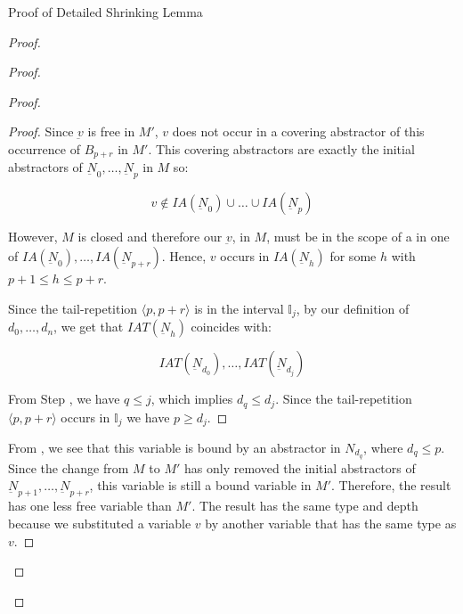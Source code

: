 \begin{frame}[allowframebreaks]{Proof of Detailed Shrinking Lemma}
\begin{proof}
\begin{proof}
\begin{proof}
\begin{proof}
Since $\underbar{v}$ is free in $M'$, $v$ does not occur in a covering abstractor of this occurrence of $B_{p+r}$ in $M'$. This covering abstractors are exactly the initial abstractors of $\underbar{N}_0, \ldots, \underbar{N}_p$ in $M$ so: 

\begin{equation*}
    v \notin IA(\underbar{N}_0) \cup \ldots \cup IA(\underbar{N}_p)
\end{equation*}

\medskip 

However, $M$ is closed and therefore our $\underbar{v}$, in $M$, must be in the scope of a  in one of 
$IA(\underbar{N}_0), \ldots, IA(\underbar{N}_{p+r})$. Hence, $v$ occurs in $IA(\underbar{N}_h)$ for some $h$ with $p+1 \leq h \leq p + r$.
\medskip  


\framebreak

Since the tail-repetition $\langle p, p+r \rangle$ is in the interval $\mathbb{I}_j$, by our definition of $d_0, \ldots, d_n$, we get that 
$IAT(\underbar{N}_h)$ coincides with: 

\begin{equation*}
    IAT(\underbar{N}_{d_0}), \ldots, IAT(\underbar{N}_{d_j})
\end{equation*}
    

\medskip 


\medskip 

From Step , we have $q \leq j$, which implies $d_q \leq d_j$. Since the tail-repetition $\langle p, p+r \rangle$ occurs in $\mathbb{I}_j$ we have $p \geq d_j$. 
\end{proof}

\framebreak

From , we see that this variable is bound by an abstractor in  $N_{d_q}$, where $d_q \leq p$. Since the change from $M$ to $M'$ has only removed the initial abstractors of $\underbar{N}_{p+1}, \ldots, \underbar{N}_{p+r}$, this variable is still a bound variable in $M'$. Therefore, the result has one less free variable than $M'$. The result has the same type and depth because we substituted a variable $v$ by another variable that has the same type as $v$. 


\end{proof}
\end{proof}
\end{proof}
\end{frame}
